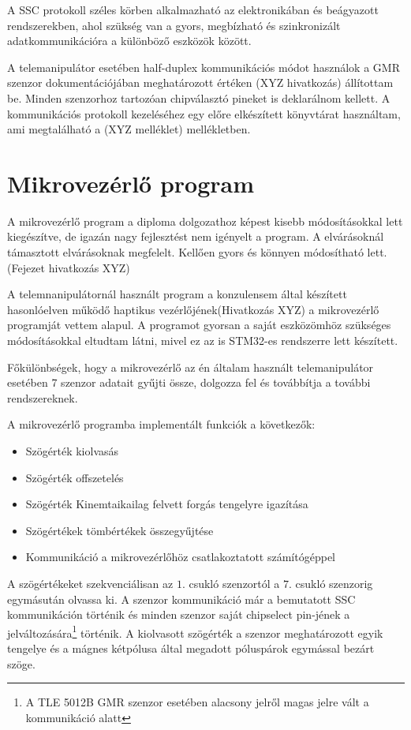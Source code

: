 A SSC protokoll széles körben alkalmazható az elektronikában és beágyazott rendszerekben, ahol szükség van a gyors, megbízható és szinkronizált adatkommunikációra a különböző eszközök között.

A telemanipulátor esetében half-duplex kommunikációs módot használok a GMR szenzor dokumentációjában meghatározott értéken (XYZ hivatkozás) állítottam be. Minden szenzorhoz tartozóan chipválasztó pineket is deklarálnom kellett. A kommunikációs protokoll kezeléséhez egy előre elkészített könyvtárat használtam, ami megtalálható a (XYZ melléklet) mellékletben.


\section{Mikrovezérlő program}

A mikrovezérlő program a diploma dolgozathoz képest kisebb módosításokkal lett kiegészítve, de igazán nagy fejlesztést nem igényelt a program. A elvárásoknál támasztott elvárásoknak megfelelt. Kellően gyors és könnyen módosítható lett. (Fejezet hivatkozás XYZ)

A telemnanipulátornál használt program a konzulensem által készített hasonlóelven működő haptikus vezérlőjének(Hivatkozás XYZ) a mikrovezérlő programját vettem alapul. A programot gyorsan a saját eszközömhöz szükséges módosításokkal eltudtam látni, mivel ez az is STM32-es rendszerre lett készített.

Főkülönbségek, hogy a mikrovezérlő az én általam használt telemanipulátor esetében 7 szenzor adatait gyűjti össze, dolgozza fel és továbbítja a további rendszereknek.

A mikrovezérlő programba implementált funkciók a következők:

\begin{itemize}
\item Szögérték kiolvasás
\item Szögérték offszetelés
\item Szögérték Kinemtaikailag felvett forgás tengelyre igazítása
\item Szögértékek tömbértékek összegyűjtése
\item Kommunikáció a mikrovezérlőhöz csatlakoztatott számítógéppel
\end{itemize}

A szögértékeket szekvenciálisan az $1.$ csukló szenzortól a $7.$ csukló szenzorig egymásután olvassa ki. A szenzor kommunikáció már a bemutatott SSC kommunikáción történik és minden szenzor saját chipselect pin-jének a jelváltozására\footnote{A TLE 5012B GMR szenzor esetében alacsony jelről magas jelre vált a kommunikáció alatt} történik. A kiolvasott szögérték a szenzor meghatározott egyik tengelye és a mágnes kétpólusa által megadott póluspárok egymással bezárt szöge.

